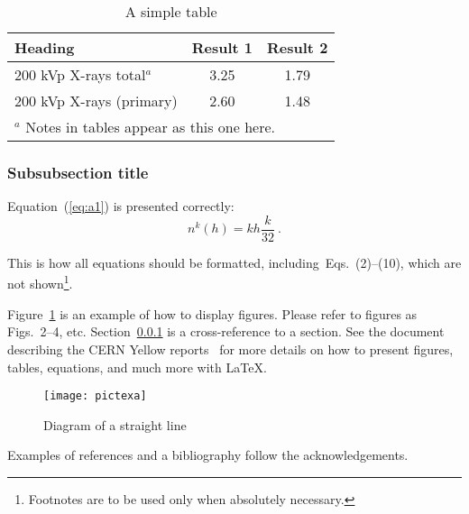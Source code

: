 \documentclass{cernrep}
\begin{document}
\begin{table}[h]
\begin{center}
\caption{A simple table}
\label{tab:LET}
\begin{tabular}{p{6cm}cc}
\hline\hline
\textbf{Heading}             & \textbf{Result 1}
                                                & \textbf{Result 2}\\
\hline
200 kVp X-rays total$^{a}$   & 3.25             & 1.79 \\
200 kVp X-rays (primary)     & 2.60             & 1.48 \\
\hline\hline
\multicolumn{3}{l}{$^{a}$ \footnotesize Notes in tables appear as
                      this one here.}
\end{tabular}
\end{center}
\end{table}

\subsubsection{Subsubsection title}
\label{sec:sss}

Equation~(\ref{eq:a1}) is presented correctly:
\begin{equation}
n^k(h)= k h \frac{k}{32}~. \label{eq:a1}  
\end{equation}

This is how all equations should be formatted,
including~Eqs.~(2)--(10), 
which are not shown\footnote{Footnotes are
to be used only when absolutely necessary.}.


Figure~\ref{tab:LET} is an example of how to display figures. Please
refer to figures as Figs.~2--4, etc.
Section~\ref{sec:sss} is a cross-reference to a section. 
See the document describing the CERN Yellow reports~\cite{cernrep} for more
details on how to present figures, tables, equations, and much more
with \LaTeX. 

\begin{figure}[ht]
\begin{center}
\texttt{[image: pictexa]}
\caption{Diagram of a straight line}
\label{fig:line}
\end{center}
\end{figure}

Examples of references and a bibliography follow the acknowledgements.
\end{document}
